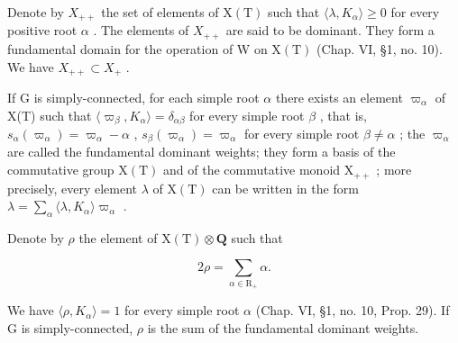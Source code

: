 Denote by \(X_{++}\) the set of elements of \(\mathrm{X(T)}\) such that \(\langle\lambda,K_{\alpha}\rangle\geq0\) for every positive root \(\alpha\) . The elements of \(X_{++}\) are said to be dominant. They form a fundamental domain for the operation of W on \(\mathrm{X(T)}\) (Chap. VI, §1, no. 10). We have \(X_{++}\subset X_{+}\) .

If G is simply-connected, for each simple root \(\alpha\) there exists an element \(\varpi_{\alpha}\) of X(T) such that \(\langle\varpi_{\beta}, K_{\alpha}\rangle = \delta_{\alpha\beta}\) for every simple root \(\beta\) , that is, \(s_{\alpha}(\varpi_{\alpha}) = \varpi_{\alpha} - \alpha\) , \(s_{\beta}(\varpi_{\alpha}) = \varpi_{\alpha}\) for every simple root \(\beta \neq \alpha\) ; the \(\varpi_{\alpha}\) are called the fundamental dominant weights; they form a basis of the commutative group \(\mathrm{X(T)}\) and of the commutative monoid \(\mathrm{X}_{++}\) ; more precisely, every element \(\lambda\) of \(\mathrm{X(T)}\) can be written in the form \(\lambda = \sum_{\alpha} \langle \lambda, K_{\alpha} \rangle \varpi_{\alpha}\) .

Denote by \(\rho\) the element of \(\mathrm{X(T)}\otimes \mathbf{Q}\) such that

\[
2 \rho = \sum_ {\alpha \in \mathrm{R} _ {+}} \alpha .
\]

We have \(\langle\rho,K_{\alpha}\rangle=1\) for every simple root \(\alpha\) (Chap. VI, §1, no. 10, Prop. 29). If G is simply-connected, \(\rho\) is the sum of the fundamental dominant weights.


